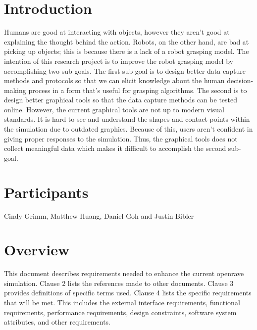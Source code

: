 \documentclass[10pt,journal,compsoc]{IEEEtran}
\begin{document}
\section*{Introduction}
\vspace{3mm}
Humans are good at interacting with objects, however they aren't good at explaining the thought behind the action.
Robots, on the other hand, are bad at picking up objects; this is because there is a lack of a robot grasping model.
The intention of this research project is to improve the robot grasping model by accomplishing two sub-goals.
The first sub-goal is to design better data capture methods and protocols so that we can elicit knowledge about the human decision-making process in a form that's useful for grasping algorithms.
The second is to design better graphical tools so that the data capture methods can be tested online.
However, the current graphical tools are not up to modern visual standards.
It is hard to see and understand the shapes and contact points within the simulation due to outdated graphics.
Because of this, users aren't confident in giving proper responses to the simulation.
Thus, the graphical tools does not collect meaningful data which makes it difficult to accomplish the second sub-goal. \\

\section*{Participants}
\vspace{3mm}
Cindy Grimm, Matthew Huang, Daniel Goh and Justin Bibler \\ 


\newpage

\tableofcontents

\newpage

\section{Overview}
\vspace{3mm}
This document describes requirements needed to enhance the current openrave simulation. 
Clause 2 lists the references made to other documents. 
Clause 3 provides definitions of specific terms used.
Clause 4 lists the specific requirements that will be met.
This includes the external interface requirements, functional requirements, performance requirements, design constraints, software system attributes, and other requirements.

\vfill
\end{document}

